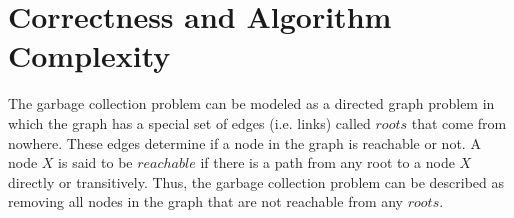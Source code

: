 



\section{Correctness and Algorithm Complexity}
\label{section:correctness}



The garbage collection problem can be modeled as a directed graph problem in which the graph has a special set of edges (i.e. links) called $roots$ that come from nowhere. These edges determine if a node in the graph is reachable or not. A node $X$  is said to be $reachable$ if there is a path from any root to a node $X$ directly or transitively. Thus, the garbage collection problem can be described as removing all nodes in the graph that are not reachable from any $roots$.

